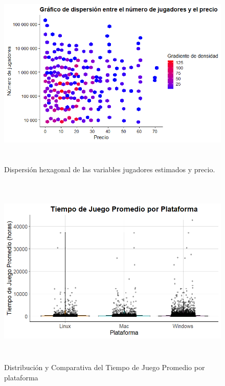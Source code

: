 \documentclass[
  letterpaper,
  DIV=11,
  numbers=noendperiod]{scrreprt}
\begin{document}
\begin{figure}

{\centering \includegraphics[width=138mm,height=92mm]{./imagenes/Rplot02.png}

}

\caption{Dispersión hexagonal de las variables jugadores estimados y
precio.}

\end{figure}

\begin{figure}

{\centering \includegraphics[width=138mm,height=92mm]{./imagenes/GrafJoseph1.png}

}

\caption{Distribución y Comparativa del Tiempo de Juego Promedio por
plataforma}

\end{figure}
\end{document}
